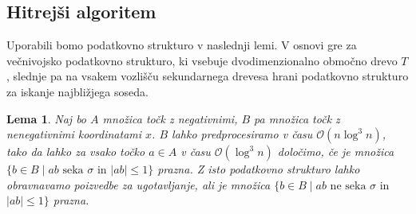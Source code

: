 \documentclass[a4paper, 12pt]{book}
\newcommand{\OO}{\ensuremath{\mathcal{O}}} %
\newtheorem{lema}[izrek]{Lema}
\begin{document}
\subsection{Hitrejši algoritem}
\label{compact}

Uporabili bomo podatkovno strukturo v naslednji lemi. V osnovi gre za večnivojsko podatkovno strukturo, ki vsebuje dvodimenzionalno območno drevo $T$, slednje pa na vsakem vozlišču sekundarnega drevesa hrani podatkovno strukturo za iskanje najbližjega soseda. 

\begin{lema}
\label{lema-ds2}
Naj bo $A$ množica točk z negativnimi, $B$ pa množica točk z nenegativnimi koordinatami $x$. $B$ lahko predprocesiramo v času $\OO(n\log^3n)$, tako da lahko za vsako točko $a\in A$ v času $\OO(\log^3n)$ določimo, če je množica $\{ b\in B \mid \text{$ab$ seka $\sigma$ in $|ab|\le 1$}\}$ prazna. Z isto podatkovno strukturo lahko obravnavamo poizvedbe za ugotavljanje, ali je množica $\{ b\in B \mid \text{$ab$ ne seka $\sigma$ in }$ \\ $\text{$|ab|\le 1$}\}$ prazna.
\end{lema}
\end{document}
